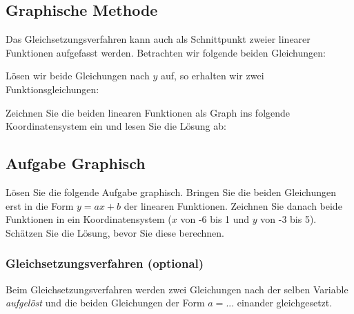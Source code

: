 
\newpage


\GESO{}
\newpage


\subsection{Graphische Methode}
Das Gleichsetzungsverfahren kann auch als Schnittpunkt zweier linearer Funktionen
aufgefasst werden. Betrachten wir folgende beiden Gleichungen:


Lösen wir beide Gleichungen nach $y$ auf, so erhalten wir zwei Funktionsgleichungen:



Zeichnen Sie die beiden linearen Funktionen als Graph ins folgende
Koordinatensystem ein und lesen Sie die Lösung  ab:

\newpage


\subsection*{Aufgabe Graphisch}
  Lösen Sie die folgende Aufgabe graphisch. Bringen Sie die beiden Gleichungen erst in die Form $y=ax+b$ der linearen Funktionen. Zeichnen Sie danach beide Funktionen in ein Koordinatensystem ($x$ von -6 bis 1 und $y$ von -3 bis 5). Schätzen Sie die Lösung, bevor Sie diese berechnen.



\newpage

\subsubsection{Gleichsetzungsverfahren (optional)}\label{lin_gl_gleichsetzungsverfahren}
Beim Gleichsetzungsverfahren werden zwei Gleichungen nach der selben Variable \textit{aufgelöst} und die beiden Gleichungen der Form $a = ...$ einander gleichgesetzt.

